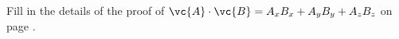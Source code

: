 Fill in the details of the proof of
  $\vc{A}\cdot\vc{B} = A_xB_x+A_yB_y+A_zB_z$
on page \pageref{dot-product-by-components}.
